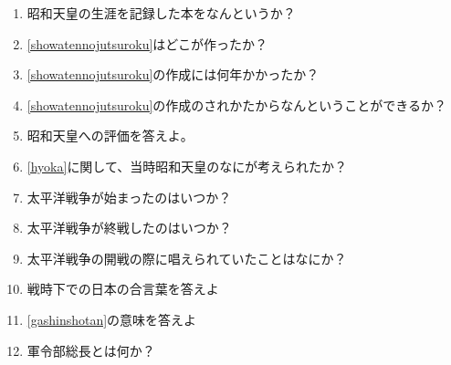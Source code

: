 \documentclass[]{article}
\begin{document}
\begin{enumerate}
	      \\
	\item 昭和天皇の生涯を記録した本をなんというか？\label{showatennojutsuroku}
	\item \ref{showatennojutsuroku}はどこが作ったか？
	\item \ref{showatennojutsuroku}の作成には何年かかったか？
	\item \ref{showatennojutsuroku}の作成のされかたからなんということができるか？
	\item 昭和天皇への評価を答えよ。\label{hyoka}
	\item \ref{hyoka}に関して、当時昭和天皇のなにが考えられたか？
	\item 太平洋戦争が始まったのはいつか？
	\item 太平洋戦争が終戦したのはいつか？
	\item 太平洋戦争の開戦の際に唱えられていたことはなにか？
	\item 戦時下での日本の合言葉を答えよ\label{gashinshotan}
	\item \ref{gashinshotan}の意味を答えよ
	\item 軍令部総長とは何か？
\end{enumerate}

\begin{comment}
\begin{figure}[htbp]
	\begin{center}
		\texttt{[image: ./src/RC\_series\_circuit\_c.png]}
		\caption{RC直列回路 ($V_C$の測定)}
		\label{fig:RC_series_circuit_c}
	\end{center}
\end{figure}
\begin{equation}
	\label{Relationship_between_impedance_Z}
	V = ZI [\si{\volt}], I = \frac{V}{Z} [\si{\ampere}], Z = \frac{V}{I}[\si{\ohm}]
\end{equation}
\begin{table}[h]
	\caption{計測および実験補助器具}
	\label{tab:fixtures}
	\centering
	\begin{tabular}{|c|c|c|c|}
		\hline
		器具名 & 製造元 & 計器番号 & 定格 \\
	\end{tabular}
\end{table}
\end{comment}
\end{document}
